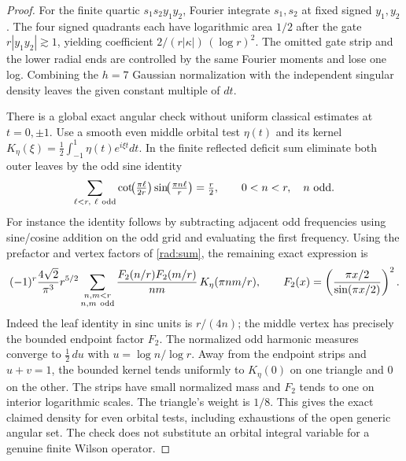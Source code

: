 \begin{proof}
For the finite quartic \(s_1s_2y_1y_2\), Fourier integrate
\(s_1,s_2\) at fixed signed \(y_1,y_2\). The four signed
quadrants each have logarithmic area \(1/2\) after the
gate \(r|y_1y_2|\gtrsim1\), yielding coefficient
\(2/(r|\kappa|)\,(\log r)^2\). The omitted gate strip and
the lower radial ends are controlled by the same Fourier
moments and lose one log. Combining the \(h=7\) Gaussian
normalization with the independent singular density leaves
the given constant multiple of \(dt\).

There is a global exact angular check without uniform
classical estimates at \(t=0,\pm1\). Use a smooth even
middle orbital test \(\eta(t)\) and its kernel
\(K_\eta(\xi)=\frac12\int_{-1}^1\eta(t)e^{i\xi t}dt\).
In the finite reflected deficit sum eliminate both
outer leaves by the odd sine identity
\[
 \sum_{\ell<r,\ \ell\ {\rm odd}}
     \cot\!\bigl(\tfrac{\pi\ell}{2r}\bigr)
                    \sin\!\bigl(\tfrac{\pi n\ell}{r}\bigr)
     =\tfrac r2,\qquad 0<n<r,\quad n\ {\rm odd}.
\]
For instance the identity follows by subtracting adjacent
odd frequencies using sine/cosine addition on the odd
grid and evaluating the first frequency. Using the
prefactor and vertex factors of \eqref{rad:sum}, the
remaining exact expression is
\[
 (-1)^r\frac{4\sqrt2}{\pi^3}r^{5/2}
 \sum_{\substack{n,m<r\\ n,m\ {\rm odd}}}
 \frac{F_2(n/r)F_2(m/r)}{nm}\,
 K_\eta(\pi nm/r),\qquad
 F_2(x)=\left(\frac{\pi x/2}{\sin(\pi x/2)}\right)^2 .
\]
Indeed the leaf identity in sinc units is \(r/(4n)\);
the middle vertex has precisely the bounded endpoint
factor \(F_2\). The normalized odd harmonic measures
converge to \(\tfrac12\,du\) with \(u=\log n/\log r\).
Away from the endpoint strips and \(u+v=1\), the
bounded kernel tends uniformly to \(K_\eta(0)\) on
one triangle and 0 on the other. The strips have small
normalized mass and \(F_2\) tends to one on interior
logarithmic scales. The triangle's weight is \(1/8\).
This gives the exact claimed density for even orbital
tests, including exhaustions of the open generic
angular set. The check does not substitute an orbital
integral variable for a genuine finite Wilson operator.


\end{proof}
